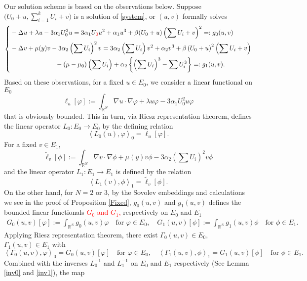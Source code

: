 \documentclass[a4paper,11pt]{article}
\newcommand{\tcr}{\textcolor{red}}
\theoremstyle{remark}
\begin{document}
 Our solution scheme is based on the observations below. Suppose $\Big(U_0 +u, \displaystyle \sum_{i=1}^k U_i + v\Big)$ is a solution of \eqref{system}, or $(u,v)$ formally solves
\begin{equation*}
 \left\{
 \begin{aligned}
 &-\Delta u + \lambda u - 3\alpha_1U_0^2 u = 3\alpha_1U_{\tcr{0}} u^2 + \alpha_1u^3 + \beta(U_0+u)\left(\sum U_i +v\right)^2=:g_0(u,v)\\
 &-\Delta v + \mu(y) v - 3\alpha_2\left(\sum U_i\right)^2 v = 3\alpha_2\left(\sum U_i\right)v^2 + \alpha_2v^3 + \beta\left(U_0 +u\right)^2\left(\sum U_i +v\right)  \\
 & \quad \quad \quad \quad \quad \quad \quad - (\mu-\mu_0)\left(\sum U_i\right)+ \alpha_2\left\{ \left(\sum U_i\right)^3 - \sum U_i^3 \right\} =:g_1(u,v).
 \end{aligned}
 \right.
\end{equation*}
Based on these observations, for a fixed $u \in E_0$, we consider a linear functional on $E_0$
$$\ell_u[\varphi] := \int_{ \mathbb{R}^N} \nabla u\cdot\nabla\varphi + \lambda u \varphi - 3\alpha_1 U_0^2 u\varphi$$
that is obviously bounded. This in turn, via Riesz representation theorem, defines the linear operator $L_0: E_0 \rightarrow E_0$ by the defining relation
$$\left<L_0(u),\varphi\right>_0 = \ell_u[\varphi].$$
For a fixed $v \in E_1$,
$$\tilde\ell_v[\phi]:=\int_{ \mathbb{R}^N} \nabla v\cdot\nabla\phi + \mu(y) v \phi - 3\alpha_2 \left(\sum U_i\right)^2 v\phi$$
and the linear operator $L_1: E_1 \rightarrow E_1$ is defined by the relation
$$\left<L_1(v),\phi\right>_1 = \tilde\ell_v[\phi].$$
On the other hand, for $N=2$ or $3$, by the Sovolev embeddings and calculations we see in the proof of Proposition \ref{Fixed}, $g_0(u,v)$ and $g_1(u,v)$ {defines the bounded linear functionals \tcr{$G_0$ and $G_1$,} respectively on $E_0$ and $E_1$} 
\begin{align*}
 G_0(u,v)[\varphi]:=\int_{ \mathbb{R}^N} g_0(u,v)\varphi \quad \text{for $\varphi \in E_0$}, \quad
 G_1(u,v)[\phi]:=\int_{ \mathbb{R}^N} g_1(u,v)\phi \quad \text{for $\phi \in E_1$}.
\end{align*}
Applying Riesz representation theorem, there exist $\Gamma_0(u,v) \in E_0$, $\Gamma_1(u,v) \in E_1$ with
$$\left<\Gamma_0(u,v),\varphi\right>_0 = G_0(u,v)[\varphi] \quad \text{for $\varphi \in E_0$}, \quad \left<\Gamma_1(u,v),\phi\right>_1 = G_1(u,v)[\phi] \quad \text{for $\phi \in E_1$}.$$
Combined with the inverses $L_0^{-1}$ and $L_1^{-1}$ on $E_0$ and $E_1$ respectively (See Lemma \ref{inv0} and \ref{inv1}), the map
\end{document}

